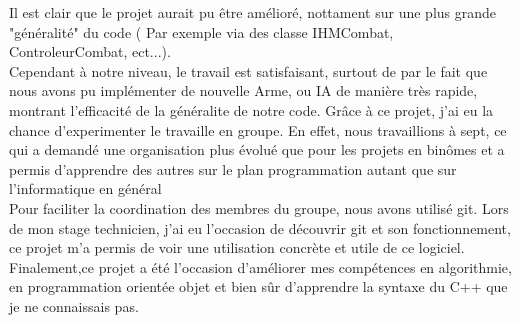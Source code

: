             Il est clair que le projet aurait pu être amélioré, nottament sur une plus grande "généralité" du code ( Par exemple via des classe IHMCombat, ControleurCombat, ect...). \\
            Cependant à notre niveau, le travail est satisfaisant, surtout de par le fait que nous avons pu implémenter de nouvelle Arme, ou IA de manière très rapide, montrant l'efficacité de la généralite de notre code.
            Grâce à ce projet, j'ai eu la chance d'experimenter le travaille en groupe. En effet, nous travaillions à sept, ce qui a demandé une organisation plus évolué que pour les projets en binômes et a permis d'apprendre des autres sur le plan programmation autant que sur l'informatique en général\\
            Pour faciliter la coordination des membres du groupe,  nous avons utilisé git. Lors de mon stage technicien, j'ai eu l'occasion de découvrir git et son fonctionnement, ce projet m'a permis de voir une utilisation concrète et utile de ce logiciel.\\
            Finalement,ce projet a été l'occasion d'améliorer mes compétences en algorithmie, en programmation orientée objet et bien sûr d'apprendre la syntaxe du C++ que je ne connaissais pas. 
